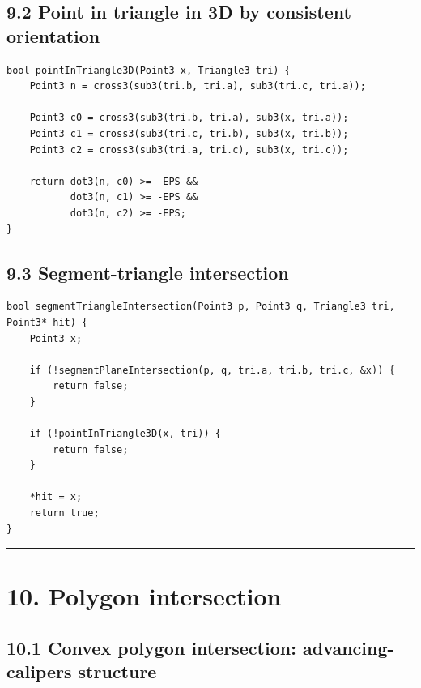 \documentclass[11pt]{article}
\begin{document}
\subsection{9.2 Point in triangle in 3D by consistent
orientation}\label{point-in-triangle-in-3d-by-consistent-orientation}

\begin{verbatim}
bool pointInTriangle3D(Point3 x, Triangle3 tri) {
    Point3 n = cross3(sub3(tri.b, tri.a), sub3(tri.c, tri.a));

    Point3 c0 = cross3(sub3(tri.b, tri.a), sub3(x, tri.a));
    Point3 c1 = cross3(sub3(tri.c, tri.b), sub3(x, tri.b));
    Point3 c2 = cross3(sub3(tri.a, tri.c), sub3(x, tri.c));

    return dot3(n, c0) >= -EPS &&
           dot3(n, c1) >= -EPS &&
           dot3(n, c2) >= -EPS;
}
\end{verbatim}

\subsection{9.3 Segment-triangle
intersection}\label{segment-triangle-intersection}

\begin{verbatim}
bool segmentTriangleIntersection(Point3 p, Point3 q, Triangle3 tri, Point3* hit) {
    Point3 x;

    if (!segmentPlaneIntersection(p, q, tri.a, tri.b, tri.c, &x)) {
        return false;
    }

    if (!pointInTriangle3D(x, tri)) {
        return false;
    }

    *hit = x;
    return true;
}
\end{verbatim}

\begin{center}\rule{0.5\linewidth}{0.5pt}\end{center}

\section{10. Polygon intersection}\label{polygon-intersection}

\subsection{10.1 Convex polygon intersection: advancing-calipers
structure}\label{convex-polygon-intersection-advancing-calipers-structure}
\end{document}
